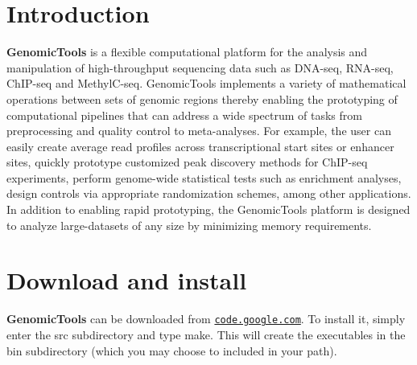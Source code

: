 \hypertarget{index_intro}{}\section{Introduction}\label{index_intro}
{\bf GenomicTools} is a flexible computational platform for the analysis and manipulation of high-throughput sequencing data such as DNA-seq, RNA-seq, ChIP-seq and MethylC-seq. GenomicTools implements a variety of mathematical operations between sets of genomic regions thereby enabling the prototyping of computational pipelines that can address a wide spectrum of tasks from preprocessing and quality control to meta-analyses. For example, the user can easily create average read profiles across transcriptional start sites or enhancer sites, quickly prototype customized peak discovery methods for ChIP-seq experiments, perform genome-wide statistical tests such as enrichment analyses, design controls via appropriate randomization schemes, among other applications. In addition to enabling rapid prototyping, the GenomicTools platform is designed to analyze large-datasets of any size by minimizing memory requirements.\hypertarget{index_download}{}\section{Download and install}\label{index_download}
{\bf GenomicTools} can be downloaded from \href{http://http://code.google.com/p/ibm-cbc-genomic-tools/}{\tt code.google.com}. To install it, simply enter the src subdirectory and type make. This will create the executables in the bin subdirectory (which you may choose to included in your path). 